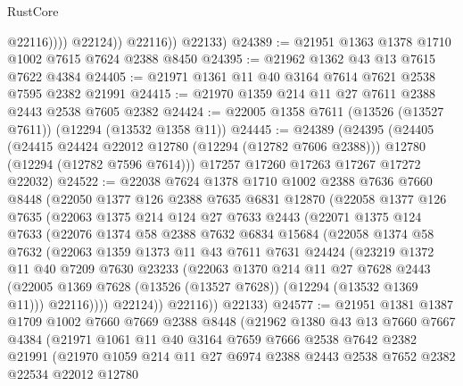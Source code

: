 \begin{lexlean}{RustCore}
\begin{coremodule}
                      @22116))))
              @22124))
          @22116))
      @22133)
@24389 := @21951 @1363 @1378 @1710 @1002 @7615 @7624 @2388 @8450
@24395 := @21962 @1362 @43 @13 @7615 @7622 @4384
@24405 := @21971 @1361 @11 @40 @3164 @7614 @7621 @2538 @7595 @2382 @21991
@24415 := @21970 @1359 @214 @11 @27 @7611 @2388 @2443 @2538 @7605 @2382
@24424 := @22005 @1358 @7611 (@13526 (@13527 @7611)) (@12294 (@13532 @1358 @11))
@24445 := @24389
    (@24395
      (@24405
        (@24415 @24424 @22012 @12780 (@12294 (@12782 @7606 @2388)))
        @12780
        (@12294 (@12782 @7596 @7614)))
      @17257
      @17260
      @17263
      @17267
      @17272
      @22032)
@24522 := @22038
    @7624
    @1378
    @1710
    @1002
    @2388
    @7636
    @7660
    @8448
    (@22050
      @1377
      @126
      @2388
      @7635
      @6831
      @12870
      (@22058
        @1377
        @126
        @7635
        (@22063
          @1375
          @214
          @124
          @27
          @7633
          @2443
          (@22071
            @1375
            @124
            @7633
            (@22076
              @1374
              @58
              @2388
              @7632
              @6834
              @15684
              (@22058
                @1374
                @58
                @7632
                (@22063
                  @1359
                  @1373
                  @11
                  @43
                  @7611
                  @7631
                  @24424
                  (@23219
                    @1372
                    @11
                    @40
                    @7209
                    @7630
                    @23233
                    (@22063
                      @1370
                      @214
                      @11
                      @27
                      @7628
                      @2443
                      (@22005 @1369 @7628 (@13526 (@13527 @7628)) (@12294 (@13532 @1369 @11)))
                      @22116))))
              @22124))
          @22116))
      @22133)
@24577 := @21951
    @1381
    @1387
    @1709
    @1002
    @7660
    @7669
    @2388
    @8448
    (@21962
      @1380
      @43
      @13
      @7660
      @7667
      @4384
      (@21971
        @1061
        @11
        @40
        @3164
        @7659
        @7666
        @2538
        @7642
        @2382
        @21991
        (@21970
          @1059
          @214
          @11
          @27
          @6974
          @2388
          @2443
          @2538
          @7652
          @2382
          @22534
          @22012
          @12780

\end{coremodule}
\end{lexlean}
